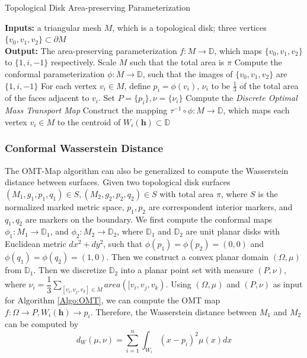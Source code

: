 \documentclass[runningheads]{llncs}
\begin{document}
\begin{algorithm}\label{Algo:DiskOMT}
\caption{Topological Disk Area-preserving Parameterization}
\begin{algorithmic}[1]
	\REQUIRE \textbf{Inputs:} a triangular mesh $M$, which is a topological disk; three vertices $\{v_0,v_1,v_2\}\subset \partial M$ \\
	\textbf{Output:} The area-preserving parameterization $f:M\rightarrow \mathbb{D}$, which maps $\{v_0,v_1,v_2\}$ to $\{1,i,-1\}$ respectively.
	\STATE Scale $M$ such that the total area is $\pi$
	\STATE Compute the conformal parameterization $\phi:M\rightarrow\mathbb{D}$, such that the images of $\{v_0,v_1,v_2\}$ are $\{1,i,-1\}$
	\STATE For each vertex $v_i\in M$, define $p_i=\phi(v_i)$, $\nu_i$ to be $\frac{1}{3}$ of the total area of the faces adjacent to $v_i$. Set $P=\{p_i\},\nu=\{\nu_i\}$
	\STATE Compute the \textit{Discrete Optimal Mass Transport Map}
	\STATE Construct the mapping $\tau^{-1}\circ\phi:M\rightarrow\mathbb{D}$, which maps each vertex $v_i\in M$ to the centroid of $W_i(\mathbf{h})\subset \mathbb{D}$	
	
\end{algorithmic}
\end{algorithm}


\subsubsection{Conformal Wasserstein Distance}
The OMT-Map algorithm can also be generalized to compute the Wasserstein distance between surfaces. Given two topological disk surfaces $(M_1,g_1,p_1,q_1)\in S, (M_2,g_2,p_2,q_2)\in S$ with total area $\pi$, where $S$ is the normalized marked metric space, $p_1, p_2$ are correspondent interior markers, and $q_1, q_2$ are markers on the boundary. We first compute the conformal maps $\phi_1:M_1\rightarrow \mathbb{D}_1$, and $\phi_2:M_2\rightarrow \mathbb{D}_2$, where $\mathbb{D}_1$ and $\mathbb{D}_2$ are unit planar disks with Euclidean metric $dx^2+dy^2$, such that $\phi(p_1)=\phi(p_2)=(0,0)$ and $\phi(q_1)=\phi(q_2)=(1,0).$ Then we construct a convex planar domain $(\Omega, \mu)$ from $\mathbb{D}_1$. Then we discretize $\mathbb{D}_2$ into a planar point set with measure $(P,\nu)$, where $\nu_i=\dfrac{1}{3}\sum_{[v_i,v_j,v_k]\in M}area([v_i,v_j,v_k)$. Using $(\Omega,\mu)$ and $(P,\nu)$ as input for Algorithm \ref{Algo:OMT}, we can compute the OMT map $f:\Omega\rightarrow P, W_i(\mathbf{h})\rightarrow p_i$. Therefore, the Wasserstein distance between $M_1$ and $M_2$ can be computed by $$d_W(\mu,\nu)=\sum^n_{i=1}\int_{W_i}(x-p_i)^2\mu(x)dx$$
\end{document}
